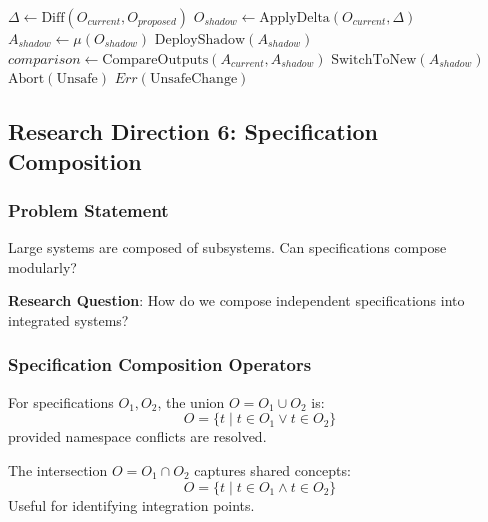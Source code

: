 \begin{algorithm}
\caption{Live Specification Update}
\begin{algorithmic}[1]
    \State $\Delta \gets \text{Diff}(O_{current}, O_{proposed})$
        \State $O_{shadow} \gets \text{ApplyDelta}(O_{current}, \Delta)$
        \State $A_{shadow} \gets \mu(O_{shadow})$ 
        \State $\text{DeployShadow}(A_{shadow})$
        \State $comparison \gets \text{CompareOutputs}(A_{current}, A_{shadow})$
            \State $\text{SwitchToNew}(A_{shadow})$
        \Else
            \State $\text{Abort}(\text{Unsafe})$
        \EndIf
    \Else
        \State \Return $Err(\text{UnsafeChange})$
    \EndIf
\EndProcedure
\end{algorithmic}
\end{algorithm}

\subsection{Research Direction 6: Specification Composition}

\subsubsection{Problem Statement}

Large systems are composed of subsystems. Can specifications compose modularly?

\textbf{Research Question}: How do we compose independent specifications into integrated systems?

\subsubsection{Specification Composition Operators}

\begin{definition}
    For specifications $O_1, O_2$, the union $O = O_1 \cup O_2$ is:
    \begin{equation}
        O = \{t \mid t \in O_1 \lor t \in O_2\}
    \end{equation}
    provided namespace conflicts are resolved.
\end{definition}

\begin{definition}
    The intersection $O = O_1 \cap O_2$ captures shared concepts:
    \begin{equation}
        O = \{t \mid t \in O_1 \land t \in O_2\}
    \end{equation}
    Useful for identifying integration points.
\end{definition}

